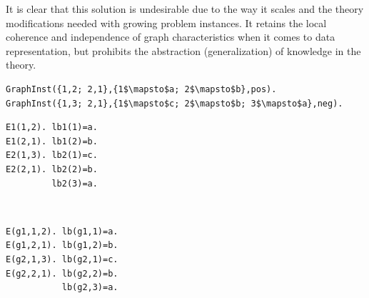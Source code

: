 It is clear that this solution is undesirable due to the way it scales and the theory modifications needed with growing problem instances.
It retains the local coherence and independence of graph characteristics when it comes to data representation, but prohibits the abstraction (generalization) of knowledge in the theory.

\begin{center}
\begin{minipage}{0.68\linewidth}
\begin{lstlisting}[mathescape,caption=Higher order predicate modeling the set $\graphset{G}$ of Def~\ref{def:gm2}.,label=lst:HOPred]
GraphInst({1,2; 2,1},{1$\mapsto$a; 2$\mapsto$b},pos).
GraphInst({1,3; 2,1},{1$\mapsto$c; 2$\mapsto$b; 3$\mapsto$a},neg).
\end{lstlisting}
\end{minipage}
\end{center}

\begin{minipage}[t]{0.45\linewidth}
\begin{lstlisting}[mathescape,caption=Multiple individual global relations,label=lst:multiglobal]
E1(1,2). lb1(1)=a.
E1(2,1). lb1(2)=b.
E2(1,3). lb2(1)=c.
E2(2,1). lb2(2)=b.
         lb2(3)=a.
\end{lstlisting}
\end{minipage}
\begin{minipage}[t]{0.1\linewidth}
 ~
\end{minipage}
\begin{minipage}[t]{0.45\linewidth}
\begin{lstlisting}[mathescape,caption=Disjoint union using indexed global relations,label=lst:indexedglobal]
E(g1,1,2). lb(g1,1)=a.
E(g1,2,1). lb(g1,2)=b.
E(g2,1,3). lb(g2,1)=c.
E(g2,2,1). lb(g2,2)=b.
           lb(g2,3)=a.
\end{lstlisting}
\end{minipage}




